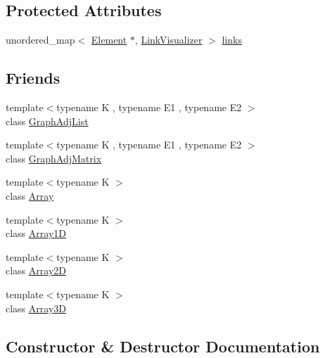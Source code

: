\subsection*{Protected Attributes}
\begin{DoxyCompactItemize}
\item 
unordered\+\_\+map$<$ \mbox{\hyperlink{classbridges_1_1datastructure_1_1_element}{Element}} $\ast$, \mbox{\hyperlink{classbridges_1_1datastructure_1_1_link_visualizer}{Link\+Visualizer}} $>$ \mbox{\hyperlink{classbridges_1_1datastructure_1_1_element_ac296ae66e6b04e95f31f4134228524f8}{links}}
\end{DoxyCompactItemize}
\subsection*{Friends}
\begin{DoxyCompactItemize}
\item 
{\footnotesize template$<$typename K , typename E1 , typename E2 $>$ }\\class \mbox{\hyperlink{classbridges_1_1datastructure_1_1_element_a65850138f0763fec43a76fb942f0eccc}{Graph\+Adj\+List}}
\item 
{\footnotesize template$<$typename K , typename E1 , typename E2 $>$ }\\class \mbox{\hyperlink{classbridges_1_1datastructure_1_1_element_a1935808473b7eb8ff54149c5436c3ac9}{Graph\+Adj\+Matrix}}
\item 
{\footnotesize template$<$typename K $>$ }\\class \mbox{\hyperlink{classbridges_1_1datastructure_1_1_element_ab1a595168ea1870ce436dfd2d8e69b6d}{Array}}
\item 
{\footnotesize template$<$typename K $>$ }\\class \mbox{\hyperlink{classbridges_1_1datastructure_1_1_element_a71a2fa1cdcc1e193c1790c39b8267780}{Array1D}}
\item 
{\footnotesize template$<$typename K $>$ }\\class \mbox{\hyperlink{classbridges_1_1datastructure_1_1_element_a335c96c00a46d6b064b5af268ae03e42}{Array2D}}
\item 
{\footnotesize template$<$typename K $>$ }\\class \mbox{\hyperlink{classbridges_1_1datastructure_1_1_element_a2adb97d98cc3a6fe0cd1daaf40058938}{Array3D}}
\end{DoxyCompactItemize}


\subsection{Constructor \& Destructor Documentation}
\mbox{\label{classbridges_1_1datastructure_1_1_element_a21820b1d88f2eb25adfe768bd03046d6}} 
